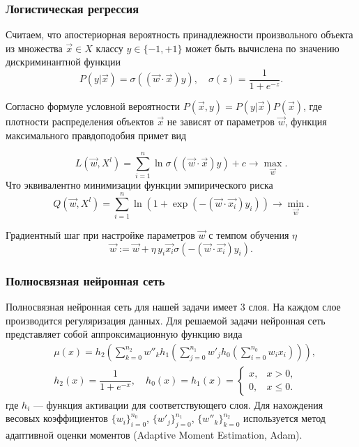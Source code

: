 \documentclass[compress,professionalfont]{beamer}
\begin{document}
\begin{frame}
\frametitle{Логистическая регрессия}
\small

Считаем, что апостериорная вероятность принадлежности произвольного объекта из множества $\vec{x} \in X$ классу $y \in \{-1, +1\}$ может быть вычислена по значению дискриминантной функции
$$
P(y|\vec{x}) = \sigma ((\vec{w} \cdot \vec{x}) y), \quad \sigma(z) = \dfrac{1}{1+ e^{-z}}.
$$

Согласно формуле условной вероятности $P(\vec{x},y) = P(y|\vec{x})P(\vec{x})$, где плотности распределения объектов $\vec{x}$ не зависят от параметров $\vec{w}$, функция максимального правдоподобия примет вид

$$
L\left(\vec{w}, X^l\right) =  \sum_{i=1}^{n} \ln \sigma((\vec{w} \cdot \vec{x})y) + c \rightarrow \max_{\vec{w}}.
$$
Что эквивалентно минимизации функции эмпирического риска
$$
Q\left(\vec{w}, X^l\right) = \sum_{i=1}^{n} \ln{\left(1 + \exp{(-(\vec{w} \cdot \vec{x_i})y_i)}\right)} \rightarrow \min_{\vec{w}}.
$$

Градиентный шаг при настройке параметров $\vec{w}$ с темпом обучения $\eta$
$$
\vec{w} := \vec{w} + \eta\,y_i \vec{x_i} \sigma(-(\vec{w} \cdot \vec{x_i})y_i).
$$

\end{frame}

\begin{frame}
\frametitle{Полносвязная нейронная сеть}
\small

Полносвязная нейронная сеть для нашей задачи имеет 3 слоя. На каждом слое производится регуляризация данных.
%
Для решаемой задачи нейронная сеть представляет собой аппроксимационную функцию вида
\begin{align*}
& \mu(x) = h_2 \left(\sum_{k=0}^{n_2} w''_k h_1\left(\sum_{j=0}^{n_1} w'_j h_0\left( \sum_{i=0}^{n_0} w_i x_i \right)\right)\right), \\
& h_2(x) = \dfrac{1}{1+e^{-x}}, \quad h_0(x) = h_1(x) = 
\begin{cases} 
x, & x > 0, \\
0, & x \leqslant 0.
\end{cases}
\end{align*}
где $h_i$ --- функция активации для соответствующего слоя. Для нахождения весовых коэффициентов $\{w_i\}_{i=0}^{n_0}$, $\{w'_j\}_{j=0}^{n_1}$, $\{w''_k\}_{k=0}^{n_2}$ используется метод адаптивной оценки моментов (Adaptive Moment Estimation, Adam).

\end{frame}
\end{document}
